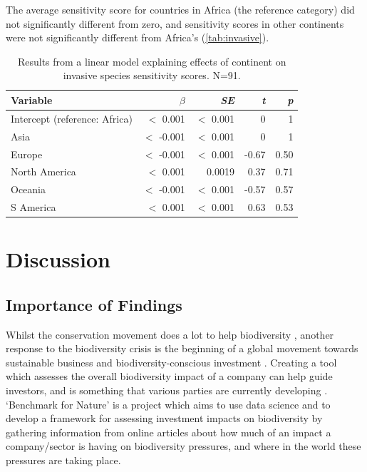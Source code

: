 \documentclass[11pt, a4paper, titlepage]{article}
\begin{document}
    The average sensitivity score for countries in Africa (the reference category) did not significantly different from zero, and sensitivity scores in other continents were not significantly different from Africa's (\autoref{tab:invasive}).
	\begin{table}[h!]
		\begin{center}
			\caption{Results from a linear model explaining effects of continent on invasive species sensitivity scores.\textmd{ N=91.}}
			\label{tab:invasive}
			\begin{tabular}{l|r|r|r|r} %
				Variable & $\beta$ & \textit{SE} & \textit{t} & \textit{p}\\
				\hline
				Intercept (reference: Africa) & $<$ 0.001 & $<$ 0.001 & 0 & 1\\
				Asia & $<$ -0.001 & $<$ 0.001 & 0 & 1\\
				Europe & $<$ -0.001 & $<$ 0.001 & -0.67 & 0.50 \\
				North America & $<$ 0.001 & 0.0019 & 0.37 & 0.71\\
				Oceania & $<$ -0.001 & $<$ 0.001 & -0.57 & 0.57\\
				S America & $<$ 0.001 & $<$ 0.001 & 0.63 & 0.53\\
				
			\end{tabular}
		\end{center}
	\end{table}

    \clearpage
    
     \section*{Discussion}
     
     \subsection*{Importance of Findings}
     Whilst the conservation movement does a lot to help biodiversity \citep{sandbrook2019global}, another response to the biodiversity crisis \citep{ogar2020science} is the beginning of a global movement towards sustainable business and biodiversity-conscious investment \citep{pri2020, worldeconomicforum2020, wwf2020}. Creating a tool which assesses the overall biodiversity impact of a company can help guide investors, and is something that various parties are currently developing \citep{worldbenchmarkingalliance_2022, iccs_2020}.  `Benchmark for Nature' is a project which aims to use data science and to develop a framework for assessing investment impacts on biodiversity by gathering information from online articles about how much of an impact a company/sector is having on biodiversity pressures\citep{iccs_2020}, and where in the world these pressures are taking place. \newline
     \clearpage
     
\end{document}
